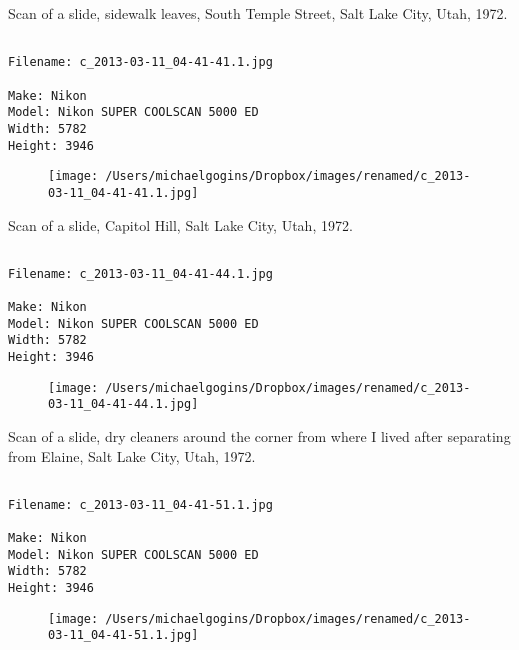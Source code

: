 \clearpage
\onecolumn
\noindent Scan of a slide, sidewalk leaves, South Temple Street, Salt Lake City, Utah, 1972.
\noindent
\begin{lstlisting}

Filename: c_2013-03-11_04-41-41.1.jpg

Make: Nikon
Model: Nikon SUPER COOLSCAN 5000 ED
Width: 5782
Height: 3946
\end{lstlisting}
\clearpage

\begin{figure}
\texttt{[image: /Users/michaelgogins/Dropbox/images/renamed/c\_2013-03-11\_04-41-41.1.jpg]}
\end{figure}
    
\clearpage
\onecolumn
\noindent Scan of a slide, Capitol Hill, Salt Lake City, Utah, 1972.
\noindent
\begin{lstlisting}

Filename: c_2013-03-11_04-41-44.1.jpg

Make: Nikon
Model: Nikon SUPER COOLSCAN 5000 ED
Width: 5782
Height: 3946
\end{lstlisting}
\clearpage

\begin{figure}
\texttt{[image: /Users/michaelgogins/Dropbox/images/renamed/c\_2013-03-11\_04-41-44.1.jpg]}
\end{figure}
    
\clearpage
\onecolumn
\noindent Scan of a slide, dry cleaners around the corner from where I lived after separating from Elaine, Salt Lake City, Utah, 1972.
\noindent
\begin{lstlisting}

Filename: c_2013-03-11_04-41-51.1.jpg

Make: Nikon
Model: Nikon SUPER COOLSCAN 5000 ED
Width: 5782
Height: 3946
\end{lstlisting}
\clearpage

\begin{figure}
\texttt{[image: /Users/michaelgogins/Dropbox/images/renamed/c\_2013-03-11\_04-41-51.1.jpg]}
\end{figure}
    
